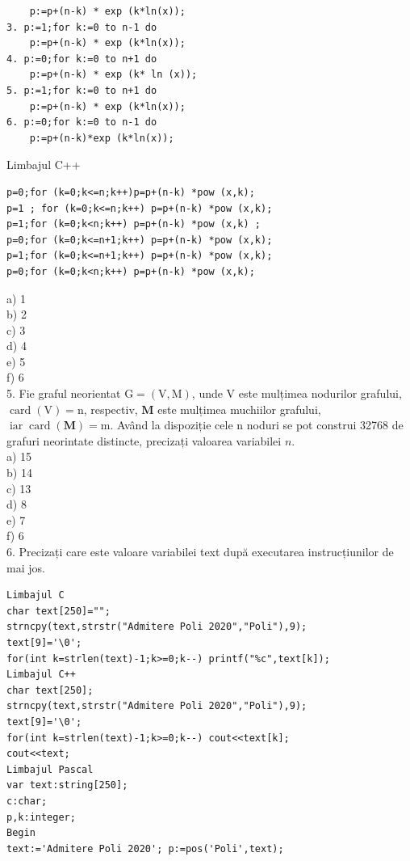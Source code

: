 \documentclass[10pt]{article}
\begin{document}
\begin{verbatim}
    p:=p+(n-k) * exp (k*ln(x));
3. p:=1;for k:=0 to n-1 do
    p:=p+(n-k) * exp (k*ln(x));
4. p:=0;for k:=0 to n+1 do
    p:=p+(n-k) * exp (k* ln (x));
5. p:=1;for k:=0 to n+1 do
    p:=p+(n-k) * exp (k*ln(x));
6. p:=0;for k:=0 to n-1 do
    p:=p+(n-k)*exp (k*ln(x));
\end{verbatim}

Limbajul C++

\begin{verbatim}
p=0;for (k=0;k<=n;k++)p=p+(n-k) *pow (x,k);
p=1 ; for (k=0;k<=n;k++) p=p+(n-k) *pow (x,k);
p=1;for (k=0;k<n;k++) p=p+(n-k) *pow (x,k) ;
p=0;for (k=0;k<=n+1;k++) p=p+(n-k) *pow (x,k);
p=1;for (k=0;k<=n+1;k++) p=p+(n-k) *pow (x,k);
p=0;for (k=0;k<n;k++) p=p+(n-k) *pow (x,k);
\end{verbatim}

a) 1\\
b) 2\\
c) 3\\
d) 4\\
e) 5\\
f) 6\\
5. Fie graful neorientat $\mathrm{G}=(\mathrm{V}, \mathrm{M})$, unde V este mulțimea nodurilor grafului, $\operatorname{card}(\mathrm{V})=\mathrm{n}$, respectiv, $\mathbf{M}$ este mulțimea muchiilor grafului, $\operatorname{iar} \operatorname{card}(\mathbf{M})=\mathrm{m}$. Având la dispoziție cele n noduri se pot construi 32768 de grafuri neorintate distincte, precizați valoarea variabilei $n$.\\
a) 15\\
b) 14\\
c) 13\\
d) 8\\
e) 7\\
f) 6\\
6. Precizați care este valoare variabilei text după executarea instrucțiunilor de mai jos.

\begin{verbatim}
Limbajul C
char text[250]="";
strncpy(text,strstr("Admitere Poli 2020","Poli"),9);
text[9]='\0';
for(int k=strlen(text)-1;k>=0;k--) printf("%c",text[k]);
Limbajul C++
char text[250];
strncpy(text,strstr("Admitere Poli 2020","Poli"),9);
text[9]='\0';
for(int k=strlen(text)-1;k>=0;k--) cout<<text[k];
cout<<text;
Limbajul Pascal
var text:string[250];
c:char;
p,k:integer;
Begin
text:='Admitere Poli 2020'; p:=pos('Poli',text);
\end{verbatim}
\end{document}
